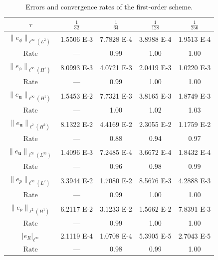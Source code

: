 \begin{table}[!htbp] 
	\caption{\small Errors and convergence rates of the first-order scheme.}   \label{tab:rate:1th:1th}
	{\footnotesize\begin{tabular*}{\columnwidth}{@{\extracolsep\fill}ccccc@{\extracolsep\fill}}
		\toprule 
		$\tau $   & $\frac{1}{32}$  &  $\frac{1}{64}$   & $\frac{1}{128}$  &  $\frac{1}{256}$\\  
		\midrule 
		 {$\|e_{\phi}\|_{\ell^\infty(L^2)}$} 		&  1.5506 E-3   & 7.7828 E-4  &  3.8988 E-4   &  1.9513 E-4 \\
		Rate & 		---         & 0.99       & 1.00        & 1.00 \\
		{$\| e_{\phi}\|_{\ell^\infty(H^1)}$} 		&  8.0993 E-3  & 4.0721 E-3   &  2.0419 E-3   & 1.0220 E-3 \\
		Rate 		& ---        & 0.99        & 1.00        & 1.00 \\ 
		{$\| e_{\bm u}\|_{\ell^\infty(H^{1})}$} 		&   1.5453 E-2  &  7.7321 E-3   & 3.8165 E-3   &   1.8749 E-3 \\
		Rate 		& ---        & 1.00        & 1.02        & 1.03 \\
		{ $\|e_{\bm u}\|_{\ell^{2}(H^{2})} $ } 		& 8.1322 E-2  & 4.4169 E-2   & 2.3055 E-2   & 1.1759 E-2 \\
		Rate		& ---      & 0.88        & 0.94        & 0.97 \\ 
		{ $\|e_{\bm u}\|_{\ell^{\infty}(L^{\infty})} $ } 		& 1.4096 E-3  & 7.2485 E-4   & 3.6672 E-4   & 1.8432 E-4 \\
		Rate		& ---      & 0.96        & 0.98        & 0.99 \\ 
		$\|e_{p}\|_{\ell^{\infty}(L^{2})}$		& 3.3944 E-2  &  1.7080 E-2  & 8.5676 E-3  &   4.2888 E-3 \\
		Rate		& ---      & 0.99        & 1.00        & 1.00 \\ 
		$\|e_{p}\|_{\ell^2(H^1)}$		& 6.2117 E-2  & 3.1233 E-2  & 1.5662 E-2  &  7.8391 E-3 \\
		Rate		& ---      & 0.99        & 1.00        & 1.00 \\ 
		{$|e_R|_{\ell^{\infty}}$} 		& 2.1119 E-4  &  1.0708 E-4   & 5.3905 E-5   & 2.7043 E-5 \\
		Rate 		& ---       & 0.98        & 0.99       & 1.00 \\  
		\bottomrule
	\end{tabular*}}
\end{table}

